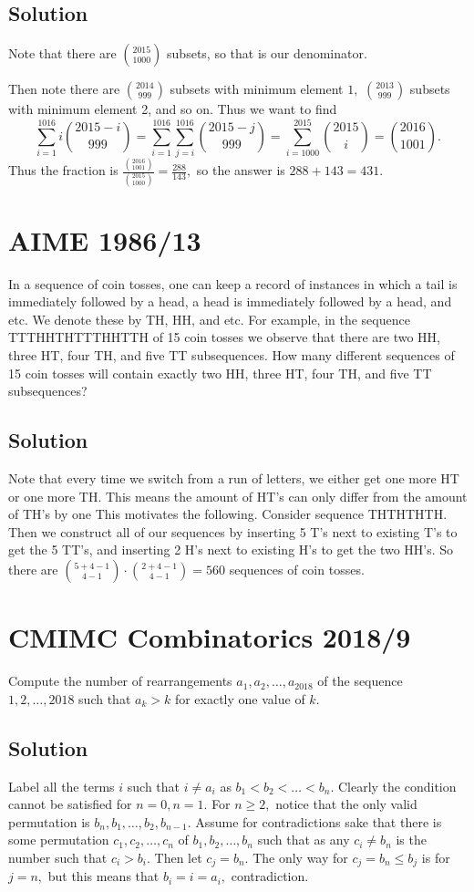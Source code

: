 \documentclass[blue,onecol]{shooting}
\begin{document}
\subsection{Solution}
Note that there are $\binom{2015}{1000}$ subsets, so that is our denominator.

Then note there are $\binom{2014}{999}$ subsets with minimum element $1,$ $\binom{2013}{999}$ subsets with minimum element 2, and so on. Thus we want to find
\[\sum_{i=1}^{1016}i\binom{2015-i}{999}=\sum_{i=1}^{1016}\sum_{j=i}^{1016}\binom{2015-j}{999}=\sum_{i=1000}^{2015}\binom{2015}{i}=\binom{2016}{1001}.\]
Thus the fraction is $\frac{\binom{2016}{1001}}{\binom{2015}{1000}}=\frac{288}{143},$ so the answer is $288+143=431.$

\section{AIME 1986/13}
In a sequence of coin tosses, one can keep a record of instances in which a tail is immediately followed by a head, a head is immediately followed by a head, and etc. We denote these by TH, HH, and etc. For example, in the sequence TTTHHTHTTTHHTTH of 15 coin tosses we observe that there are two HH, three HT, four TH, and five TT subsequences. How many different sequences of 15 coin tosses will contain exactly two HH, three HT, four TH, and five TT subsequences?

\subsection{Solution}
Note that every time we switch from a run of letters, we either get one more HT or one more TH. This means the amount of HT's can only differ from the amount of TH's by one This motivates the following. Consider sequence THTHTHTH. Then we construct all of our sequences by inserting 5 T's next to existing T's to get the 5 TT's, and inserting 2 H's next to existing H's to get the two HH's. So there are $\binom{5+4-1}{4-1}\cdot\binom{2+4-1}{4-1}=560$ sequences of coin tosses.

\section{CMIMC Combinatorics 2018/9}
Compute the number of rearrangements $a_1,a_2,\ldots,a_{2018}$ of the sequence $1,2,\ldots,2018$ such that $a_k>k$ for exactly one value of $k.$

\subsection{Solution}
Label all the terms $i$ such that $i\neq a_i$ as $b_1<b_2<\ldots<b_n.$ Clearly the condition cannot be satisfied for $n=0,n=1.$ For $n\geq 2,$ notice that the only valid permutation is $b_n,b_1,\ldots,b_2,b_{n-1}.$ Assume for contradictions sake that there is some permutation $c_1,c_2,\ldots, c_n$ of $b_1,b_2,\ldots,b_n$ such that as any $c_i\neq b_n$ is the number such that $c_i>b_i.$ Then let $c_j=b_n.$ The only way for $c_j=b_n\leq b_j$ is for $j=n,$ but this means that $b_i=i=a_i,$ contradiction.
    
\end{document}
